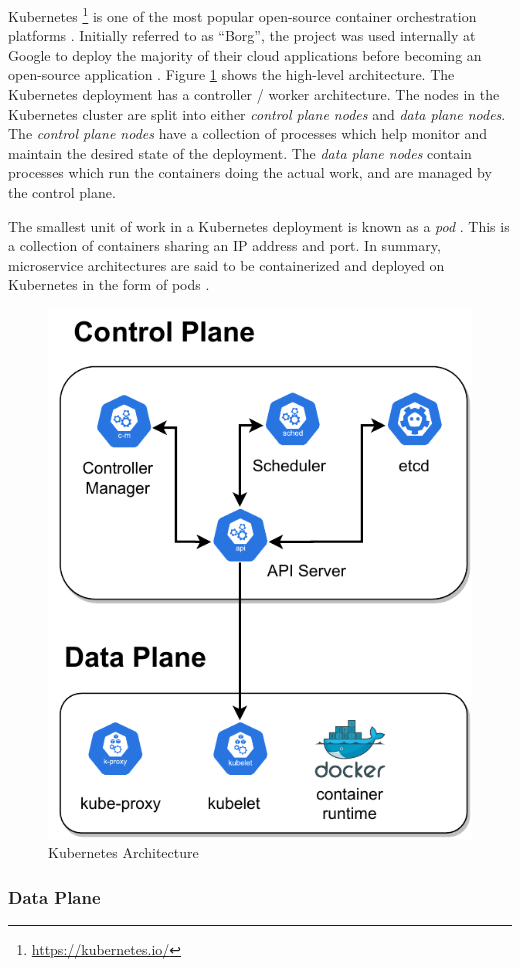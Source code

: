 Kubernetes \footnote{\url{https://kubernetes.io/}} is one of the most popular open-source container orchestration platforms \cite{vayghan2019kubernetes}. Initially referred to as ``Borg'', the project was used internally at Google to deploy the majority of their cloud applications before becoming an open-source application \cite{burns2016borg}. Figure \ref{fig:k8s-arch} shows the high-level architecture. The Kubernetes deployment has a controller / worker architecture. The nodes in the Kubernetes cluster are split into either \textit{control plane nodes} and \textit{data plane nodes}. The \textit{control plane nodes} have a collection of processes which help monitor and maintain the desired state of the deployment. The \textit{data plane nodes} contain processes which run the containers doing the actual work, and are managed by the control plane.\par
The smallest unit of work in a Kubernetes deployment is known as a \textit{pod} \cite{baier2017getting}. This is a collection of containers sharing an IP address and port. In summary, microservice architectures are said to be containerized and deployed on Kubernetes in the form of pods \cite{vayghan2019kubernetes}.\par
\begin{figure}[htb]
    \centering
    \includegraphics[width=0.5\linewidth]{Figures/K8s-Architecture.pdf}
    \caption{Kubernetes Architecture}
    \label{fig:k8s-arch}
\end{figure}

\subsubsection{Data Plane}
\label{subsubsec:k8s-data-plane}

